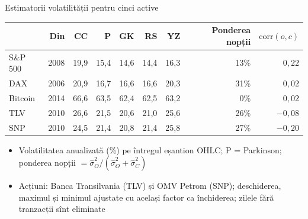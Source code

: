 \begin{frame}{Estimatorii volatilității pentru cinci active}
\itemsize{\footnotesize}
\begin{center}
\footnotesize
\begin{tabular}{lrrrrrrrr}
\toprule
& \textbf{Din} & \textbf{CC} & \textbf{P} & \textbf{GK} & \textbf{RS} & \textbf{YZ} & \textbf{Ponderea nopții} & $\mathrm{corr}(o, c)$ \\
\midrule
S\&P 500 & 2008 & 19{,}9 & 15{,}4 & 14{,}6 & 14{,}4 & 16{,}3 & 13\% & ${0{,}22}$ \\
DAX & 2006 & 20{,}9 & 16{,}7 & 16{,}6 & 16{,}6 & 20{,}3 & 31\% & ${0{,}02}$ \\
Bitcoin & 2014 & 66{,}6 & 63{,}5 & 62{,}4 & 62{,}5 & 63{,}2 & 0\% & ${0{,}02}$ \\
TLV & 2010 & 26{,}6 & 21{,}5 & 20{,}6 & 21{,}0 & 25{,}6 & 26\% & ${-0{,}08}$ \\
SNP & 2010 & 24{,}5 & 21{,}4 & 20{,}8 & 21{,}4 & 25{,}8 & 27\% & ${-0{,}20}$ \\
\bottomrule
\end{tabular}
\end{center}
\begin{itemize}
    \item Volatilitatea anualizată (\%) pe întregul eșantion OHLC; P = Parkinson; ponderea nopții $= \hat\sigma_O^2/(\hat\sigma_O^2 + \hat\sigma_C^2)$
    \item Acțiuni: Banca Transilvania (TLV) și OMV Petrom (SNP); deschiderea, maximul și minimul ajustate cu același factor ca închiderea; zilele fără tranzacții sînt eliminate
\end{itemize}
\end{frame}


